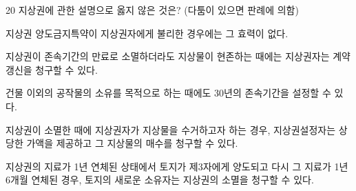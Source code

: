 \begin{question}{20}
지상권에 관한 설명으로 옳지 않은 것은? (다툼이 있으면 판례에 의함)
\begin{choices}
  \item 지상권 양도금지특약이 지상권자에게 불리한 경우에는 그 효력이 없다.
  \item 지상권이 존속기간의 만료로 소멸하더라도 지상물이 현존하는 때에는 지상권자는 계약갱신을 청구할 수 있다.
  \item 건물 이외의 공작물의 소유를 목적으로 하는 때에도 30년의 존속기간을 설정할 수 있다.
  \item 지상권이 소멸한 때에 지상권자가 지상물을 수거하고자 하는 경우, 지상권설정자는 상당한 가액을 제공하고 그 지상물의 매수를 청구할 수 있다.
  \item 지상권의 지료가 1년 연체된 상태에서 토지가 제3자에게 양도되고 다시 그 지료가 1년 6개월 연체된 경우, 토지의 새로운 소유자는 지상권의 소멸을 청구할 수 있다.
\end{choices}
\end{question}
